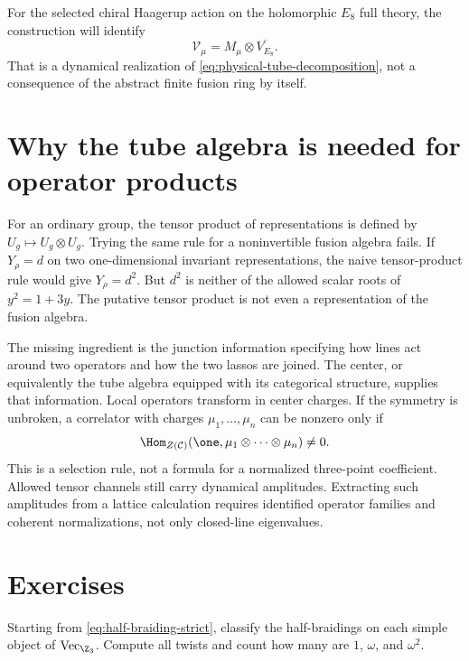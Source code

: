 For the selected chiral Haagerup action on the holomorphic $E_8$
full theory, the construction will identify
\[
 \mathcal V_\mu=M_\mu\otimes\overline{V_{E_8}}.
\]
That is a dynamical realization of
\eqref{eq:physical-tube-decomposition}, not a consequence of the
abstract finite fusion ring by itself.

\section{Why the tube algebra is needed for operator products}

For an ordinary group, the tensor product of representations is
defined by $U_g\mapsto U_g\otimes U_g$.  Trying the same rule for
a noninvertible fusion algebra fails.  If $Y_\rho=d$ on two
one-dimensional invariant representations, the naive tensor-product
rule would give $Y_\rho=d^2$.  But $d^2$ is neither of the allowed
scalar roots of $y^2=1+3y$.  The putative tensor product is not even
a representation of the fusion algebra.

The missing ingredient is the junction information specifying how
lines act around two operators and how the two lassos are joined.
The center, or equivalently the tube algebra equipped with its
categorical structure, supplies that information.  Local operators
transform in center charges.  If the symmetry is unbroken, a
correlator with charges $\mu_1,\ldots,\mu_n$ can be nonzero only
if
\begin{equation}
 \Hom_{Z(\mathcal C)}
 (\one,\mu_1\otimes\cdots\otimes\mu_n)\ne0.
 \label{eq:center-selection-rule}
\end{equation}
This is a selection rule, not a formula for a normalized three-point
coefficient.  Allowed tensor channels still carry dynamical
amplitudes.  Extracting such amplitudes from a lattice calculation
requires identified operator families and coherent normalizations,
not only closed-line eigenvalues.

\section{Exercises}

\begin{exercise}\label{ex:Z3-halfbraid}
Starting from \eqref{eq:half-braiding-strict}, classify the
half-braidings on each simple object of
$\operatorname{Vec}_{\Z_3}$.  Compute all twists and count how
many are $1$, $\omega$, and $\omega^2$.

\par\smallskip{}\par
\end{exercise}

